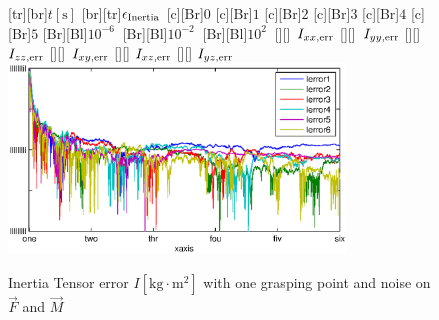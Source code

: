 \begin{figure}
	\centering	
	[tr][br]{$t\left[\mathrm{s}\right]$}
	[br][tr]{$\epsilon_{\mathrm{Inertia}}$}
	[Br]{$0$}
	[Br]{$1$}
	[Br]{$2$}
	[Br]{$3$}
	[Br]{$4$}
	[Br]{$5$}
	[Br][Bl]{$10^{-6}\  $}
	[Br][Bl]{$10^{-2}\  $}
	[Br][Bl]{$10^2\  $}
	[][]{\tiny \  $I_{xx,\mathrm{err}}$}
	[][]{\tiny \  $I_{yy,\mathrm{err}}$}
	[][]{\tiny \  $I_{zz,\mathrm{err}}$}
	[][]{\tiny \  $I_{xy,\mathrm{err}}$}
	[][]{\tiny \hspace{0.5cm} $I_{xz,\mathrm{err}}$}
	[][]{\tiny \hspace{0.5cm} $I_{yz,\mathrm{err}}$}
	\includegraphics[width=0.8\textwidth]{figures/inertia_noise.eps}
	\vspace{0.2cm}
	\caption[Inertia Tensor error, noise]{Inertia Tensor error $I \left[\mathrm{kg} \cdot \mathrm{m}^2\right]$ with one grasping point and noise on $\vec F$ and $\vec M$}
	\label{fig:estim_inertia_noise}
\end{figure}

